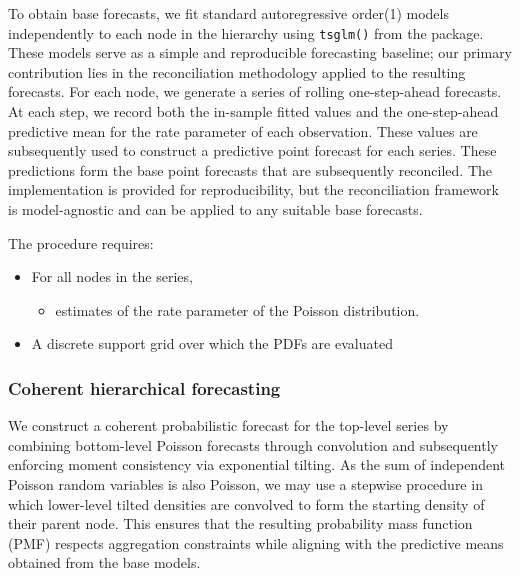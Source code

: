 To obtain base forecasts, we fit standard autoregressive order(1) models independently to each node in the hierarchy using \texttt{tsglm()} from the  package. These models serve as a simple and reproducible forecasting baseline; our primary contribution lies in the reconciliation methodology applied to the resulting forecasts. For each node, we generate a series of rolling one-step-ahead forecasts. At each step, we record both the in-sample fitted values and the one-step-ahead predictive mean for the rate parameter of each observation. These values are subsequently used to construct a predictive point forecast for each series. These predictions form the base point forecasts that are subsequently reconciled. The implementation is provided for reproducibility, but the reconciliation framework is model-agnostic and can be applied to any suitable base forecasts.

The procedure requires:

\begin{itemize}
\tightlist
\item
  For all nodes in the series,

  \begin{itemize}
  \tightlist
  \item
    estimates of the rate parameter of the Poisson distribution.
  \end{itemize}
\item
  A discrete support grid over which the PDFs are evaluated
\end{itemize}

\subsubsection{Coherent hierarchical forecasting}\label{coherent-hierarchical-forecasting}

We construct a coherent probabilistic forecast for the top-level series by combining bottom-level Poisson forecasts through convolution and subsequently enforcing moment consistency via exponential tilting. As the sum of independent Poisson random variables is also Poisson, we may use a stepwise procedure in which lower-level tilted densities are convolved to form the starting density of their parent node. This ensures that the resulting probability mass function (PMF) respects aggregation constraints while aligning with the predictive means obtained from the base models.

